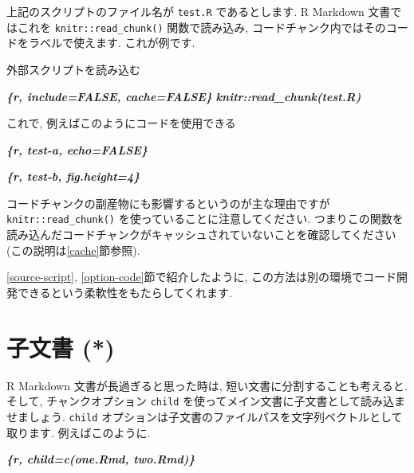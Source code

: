 \documentclass[
  11pt,
  lualatex,ja=standard,jafont=noto]{bxjsreport}
\newenvironment{Shaded}{\begin{snugshade}}{\end{snugshade}}
\newcommand{\InformationTok}[1]{\textcolor[rgb]{0.56,0.35,0.01}{\textbf{\textit{#1}}}}
\newcommand{\NormalTok}[1]{#1}
\begin{document}
上記のスクリプトのファイル名が \texttt{test.R} であるとします. R Markdown 文書ではこれを \texttt{knitr::read\_chunk()} 関数で読み込み, コードチャンク内ではそのコードをラベルで使えます. これが例です.

\begin{Shaded}
\begin{Highlighting}[]
\NormalTok{外部スクリプトを読み込む}

\InformationTok{\textasciigrave{}\textasciigrave{}\textasciigrave{}\{r, include=FALSE, cache=FALSE\}}
\InformationTok{knitr::read\_chunk(\textquotesingle{}test.R\textquotesingle{})}
\InformationTok{\textasciigrave{}\textasciigrave{}\textasciigrave{}}

\NormalTok{これで, 例えばこのようにコードを使用できる}

\InformationTok{\textasciigrave{}\textasciigrave{}\textasciigrave{}\{r, test{-}a, echo=FALSE\}}
\InformationTok{\textasciigrave{}\textasciigrave{}\textasciigrave{}}

\InformationTok{\textasciigrave{}\textasciigrave{}\textasciigrave{}\{r, test{-}b, fig.height=4\}}
\InformationTok{\textasciigrave{}\textasciigrave{}\textasciigrave{}}
\end{Highlighting}
\end{Shaded}

コードチャンクの副産物にも影響するというのが主な理由ですが \texttt{knitr::read\_chunk()} を使っていることに注意してください. つまりこの関数を読み込んだコードチャンクがキャッシュされていないことを確認してください (この説明は\ref{cache}節参照).

\ref{source-script}, \ref{option-code}節で紹介したように, この方法は別の環境でコード開発できるという柔軟性をもたらしてくれます.

\hypertarget{child-document}{%
\section{子文書 (*)}\label{child-document}}

R Markdown 文書が長過ぎると思った時は, 短い文書に分割することも考えると. そして, チャンクオプション \texttt{child} を使ってメイン文書に子文書として読み込ませましょう. \texttt{child} オプションは子文書のファイルパスを文字列ベクトルとして取ります. 例えばこのように.

\begin{Shaded}
\begin{Highlighting}[]
\InformationTok{\textasciigrave{}\textasciigrave{}\textasciigrave{}\{r, child=c(\textquotesingle{}one.Rmd\textquotesingle{}, \textquotesingle{}two.Rmd\textquotesingle{})\}}
\InformationTok{\textasciigrave{}\textasciigrave{}\textasciigrave{}}
\end{Highlighting}
\end{Shaded}
\end{document}
